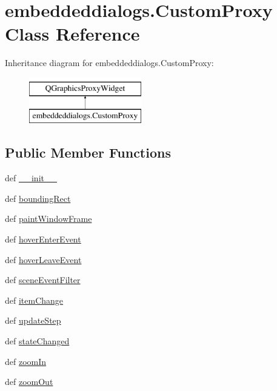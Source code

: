 \hypertarget{classembeddeddialogs_1_1CustomProxy}{}\section{embeddeddialogs.\+Custom\+Proxy Class Reference}
\label{classembeddeddialogs_1_1CustomProxy}
Inheritance diagram for embeddeddialogs.\+Custom\+Proxy\+:\begin{figure}[H]
\begin{center}
\leavevmode
\includegraphics[height=2.000000cm]{classembeddeddialogs_1_1CustomProxy}
\end{center}
\end{figure}
\subsection*{Public Member Functions}
\begin{DoxyCompactItemize}
\item 
def \hyperlink{classembeddeddialogs_1_1CustomProxy_a87940cb6a01dc16867d7f608beee8333}{\+\_\+\+\_\+init\+\_\+\+\_\+}
\item 
def \hyperlink{classembeddeddialogs_1_1CustomProxy_acb1ef51ead952e36775d54549d298185}{bounding\+Rect}
\item 
def \hyperlink{classembeddeddialogs_1_1CustomProxy_a134805d0a8ea3c70e05dd0cae1fb299b}{paint\+Window\+Frame}
\item 
def \hyperlink{classembeddeddialogs_1_1CustomProxy_aa626fea51ee21808afdd18a2c74dff5d}{hover\+Enter\+Event}
\item 
def \hyperlink{classembeddeddialogs_1_1CustomProxy_af5ba9f8a9a9abd13e219b5803f38dd95}{hover\+Leave\+Event}
\item 
def \hyperlink{classembeddeddialogs_1_1CustomProxy_aac214e2fd5c92ed22c5384da72d8d3da}{scene\+Event\+Filter}
\item 
def \hyperlink{classembeddeddialogs_1_1CustomProxy_adb505a2c6e15324f654495bf84164bbc}{item\+Change}
\item 
def \hyperlink{classembeddeddialogs_1_1CustomProxy_a26688f12854dd40018159fec662b084b}{update\+Step}
\item 
def \hyperlink{classembeddeddialogs_1_1CustomProxy_ac05625ec5796402ed710fd1752d7200a}{state\+Changed}
\item 
def \hyperlink{classembeddeddialogs_1_1CustomProxy_a9d00d5ef5c2e874e9bd0b8d112dc6382}{zoom\+In}
\item 
def \hyperlink{classembeddeddialogs_1_1CustomProxy_a02c392a3f09e6ddbdf01b0a19397ba82}{zoom\+Out}
\end{DoxyCompactItemize}
